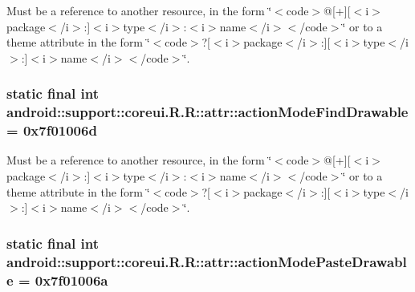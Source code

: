 Must be a reference to another resource, in the form \char`\"{}$<$code$>$@\mbox{[}+\mbox{]}\mbox{[}$<$i$>$package$<$/i$>$:\mbox{]}$<$i$>$type$<$/i$>$:$<$i$>$name$<$/i$>$$<$/code$>$\char`\"{} or to a theme attribute in the form \char`\"{}$<$code$>$?\mbox{[}$<$i$>$package$<$/i$>$:\mbox{]}\mbox{[}$<$i$>$type$<$/i$>$:\mbox{]}$<$i$>$name$<$/i$>$$<$/code$>$\char`\"{}. \hypertarget{classandroid_1_1support_1_1coreui_1_1_r_1_1attr_571b8ef3991bb9153b5415b4b455672f}{
\subsubsection[{actionModeFindDrawable}]{\setlength{\rightskip}{0pt plus 5cm}static final int android::support::coreui.R.R::attr::actionModeFindDrawable = 0x7f01006d}}
\label{classandroid_1_1support_1_1coreui_1_1_r_1_1attr_571b8ef3991bb9153b5415b4b455672f}


Must be a reference to another resource, in the form \char`\"{}$<$code$>$@\mbox{[}+\mbox{]}\mbox{[}$<$i$>$package$<$/i$>$:\mbox{]}$<$i$>$type$<$/i$>$:$<$i$>$name$<$/i$>$$<$/code$>$\char`\"{} or to a theme attribute in the form \char`\"{}$<$code$>$?\mbox{[}$<$i$>$package$<$/i$>$:\mbox{]}\mbox{[}$<$i$>$type$<$/i$>$:\mbox{]}$<$i$>$name$<$/i$>$$<$/code$>$\char`\"{}. \hypertarget{classandroid_1_1support_1_1coreui_1_1_r_1_1attr_7afd38abe34d9910a45a657195ac324c}{
\subsubsection[{actionModePasteDrawable}]{\setlength{\rightskip}{0pt plus 5cm}static final int android::support::coreui.R.R::attr::actionModePasteDrawable = 0x7f01006a}}
\label{classandroid_1_1support_1_1coreui_1_1_r_1_1attr_7afd38abe34d9910a45a657195ac324c}


